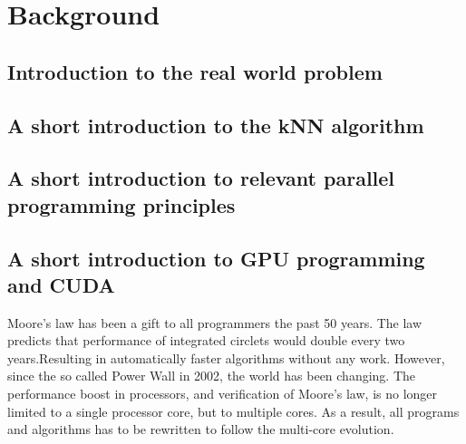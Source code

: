 \section{Background}

\subsection{Introduction to the real world problem} %
\label{sub:introduction_to_the_real_world_problem}


\subsection{A short introduction to the kNN algorithm} %
\label{a_short_introduction_to_the_kNN_algorithm}


\subsection{A short introduction to relevant parallel programming principles} %
\label{sub:a_short_introduction_to_relevant_parallel_programming_principles}


\subsection{A short introduction to GPU programming and CUDA} %
\label{sub:a_short_introduction_to_gpu_programming_and_cuda}

Moore's law has been a gift to all programmers the past 50 years. The law predicts that performance of integrated circlets would double every two years.Resulting in automatically faster algorithms without any work. However, since the so called Power Wall in 2002, the world has been changing. The performance boost  in processors, and verification of Moore's law, is no longer limited to a single processor core, but to multiple cores. As a result, all programs and algorithms has to be rewritten to follow the multi-core evolution.



